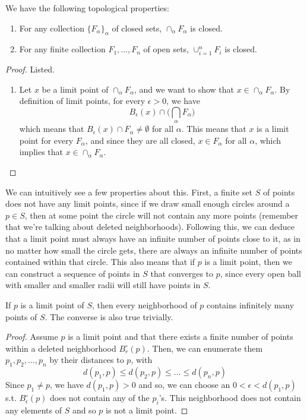     \begin{theorem}
    We have the following topological properties: 
    \begin{enumerate}
        \item For any collection $\{F_\alpha\}_\alpha$ of closed sets, $\cap_\alpha F_\alpha$ is closed. 
        \item For any finite collection $F_1, \ldots, F_n$ of open sets, $\cup_{i=1}^n F_i$ is closed. 
    \end{enumerate}
    \end{theorem}
    \begin{proof}
    Listed. 
    \begin{enumerate}
        \item Let $x$ be a limit point of $\cap_\alpha F_\alpha$, and we want to show that $x \in \cap_\alpha F_\alpha$. By definition of limit points, for every $\epsilon > 0$, we have 
        \[B_\epsilon (x) \cap \bigg( \bigcap_\alpha F_\alpha \bigg) \]
        which means that $B_\epsilon (x) \cap F_\alpha \neq \emptyset$ for all $\alpha$. This means that $x$ is a limit point for every $F_\alpha$, and since they are all closed, $x \in F_\alpha$ for all $\alpha$, which implies that $x \in \cap_\alpha F_\alpha$. 
    \end{enumerate}
    \end{proof}

    We can intuitively see a few properties about this. First, a finite set $S$ of points does not have any limit points, since if we draw small enough circles around a $p \in S$, then at some point the circle will not contain any more points (remember that we're talking about deleted neighborhoods). Following this, we can deduce that a limit point must always have an infinite number of points close to it, as in no matter how small the circle gets, there are always an infinite number of points contained within that circle. This also means that if $p$ is a limit point, then we can construct a sequence of points in $S$ that converges to $p$, since every open ball with smaller and smaller radii will still have points in $S$.

    \begin{theorem}
      If $p$ is a limit point of $S$, then every neighborhood of $p$ contains infinitely many points of $S$. The converse is also true trivially. 
    \end{theorem}
    \begin{proof}
      Assume $p$ is a limit point and that there exists a finite number of points within a deleted neighborhood $B_r^\circ (p)$. Then, we can enumerate them $p_1, p_2, \ldots, p_n$ by their distances to $p$, with 
      \begin{equation}
        d(p_1, p) \leq d(p_2, p) \leq \ldots \leq d(p_n, p)
      \end{equation}
      Since $p_1 \neq p$, we have $d(p_1, p) > 0$ and so, we can choose an $0 < \epsilon < d(p_1, p)$ s.t. $B_\epsilon^\circ (p)$ does not contain any of the $p_i$'s. This neighborhood does not contain any elements of $S$ and so $p$ is not a limit point. 
    \end{proof}

